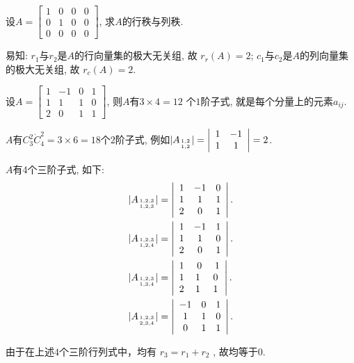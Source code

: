 \begin{eg}
设$A=\begin{bmatrix}1&0&0&0\\0&1&0&0\\0&0&0&0\end{bmatrix}$, 求$A$的行秩与列秩.

易知: $r_1$与$r_2$是$A$的行向量集的极大无关组, 故 $r_r(A)=2$; $c_1$与$c_2$是$A$的列向量集的极大无关组, 故 $r_c(A)=2$.

\end{eg}

\begin{eg}
设$A=\begin{bmatrix}1&-1&0&1\\1&1&1&0\\2&0&1&1\end{bmatrix}$, 则$A$有$3\times 4=12$ 个$1$阶子式, 就是每个分量上的元素$a_{ij}$.

$A$有$C_3^2\dot C_4^2=3\times 6=18$个$2$阶子式, 例如$|A_{1,2\atop 1,2}|=\left|\begin{array}{cc}1&-1\\1&1\end{array}\right|=2$.

$A$有4个三阶子式, 如下:
\begin{displaymath}\begin{aligned}&
|A_{1,2,3\atop 1,2,3}|=\left|\begin{array}{ccc}1&-1&0\\1&1&1\\2&0&1\end{array}\right|.\\
&|A_{1,2,3\atop 1,2,4}|=\left|\begin{array}{ccc}1&-1&1\\1&1&0\\2&0&1\end{array}\right|.\\
&|A_{1,2,3\atop 1,3,4}|=\left|\begin{array}{ccc}1&\ 0&\ 1\\1&1&0\\2&1&1\end{array}\right|.\\
&|A_{1,2,3\atop 2,3,4}|=\left|\begin{array}{ccc}-1&0&1\\1&1&0\\0&1&1\end{array}\right|.\end{aligned}
\end{displaymath}

由于在上述$4$个三阶行列式中，均有 $r_3 = r_1+r_2$ , 故均等于$0$.

\end{eg}

